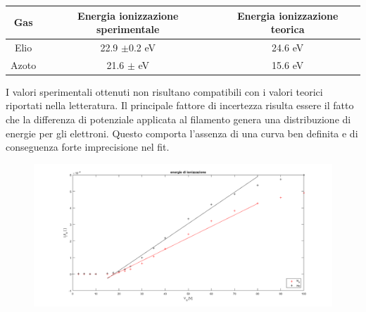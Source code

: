 \documentclass[11pt,a4paper]{article}
\begin{document}
\begin{tabular}{|c|c|c|}
\hline 
Gas & Energia ionizzazione sperimentale & Energia ionizzazione teorica \\ 
\hline 
Elio & 22.9 $ \pm $0.2 eV & 24.6 eV \\ 
\hline
Azoto & 21.6 $\pm$  eV & 15.6 eV \\ 
\hline 
\end{tabular} 


I valori sperimentali ottenuti non risultano compatibili con i valori teorici riportati nella letteratura. Il principale fattore di incertezza risulta essere il fatto che la differenza di potenziale applicata al filamento genera una distribuzione di energie per gli elettroni. Questo comporta l'assenza di una curva ben definita e di conseguenza forte imprecisione nel fit. 

\begin{figure}[h]
\includegraphics[width=\textwidth]{fig1}
\end{figure}
\end{document}
